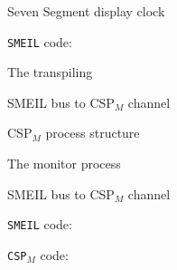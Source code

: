 \documentclass[13pt]{beamer}
\newcommand{\cspm}{CSP$_M$}
\begin{document}
\begin{frame}{Seven Segment display clock}
 \begin{block}{}
  \texttt{SMEIL} code:
    \vspace{5mm}

     \scalebox{0.8}{\usebox{\smeilexamplecode}}
 \end{block}
\end{frame}
%
\begin{frame}{The transpiling}
 \begin{block}{}
   SMEIL bus to \cspm{} channel
 \end{block}

 \pause

 \begin{block}{}
   \cspm{} process structure
 \end{block}

 \pause

 \begin{block}{}
   The monitor process
 \end{block}
\end{frame}

%
\begin{frame}{SMEIL bus to \cspm{} channel}
 \begin{block}{}
   \texttt{SMEIL} code:
     \vspace{5mm}

      \scalebox{0.8}{\usebox{\smeilchannelexample}}
 \end{block}
 \pause
 \begin{block}{}
    \texttt{\cspm{}} code:
      \vspace{5mm}

       \scalebox{0.8}{\usebox{\cspmchannelexample}}
 \end{block}
\end{frame}
\end{document}
